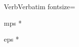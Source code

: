 


\usepackage {amsmath}      %
\usepackage {amssymb}
\usepackage {textcase}     %
\usepackage {indentfirst}  %

\usepackage {fancyvrb}     %
\DefineVerbatimEnvironment%
	{Verb}{Verbatim}
	{fontsize=\small}

\usepackage {ifpdf}        %
\ifpdf
  \usepackage [pdftex] {graphicx}
  \DeclareGraphicsRule {*} {mps} {*} {}
\else
  \usepackage [draft] {graphicx}
  \DeclareGraphicsRule {*} {eps} {*} {}
\fi









\endinput

